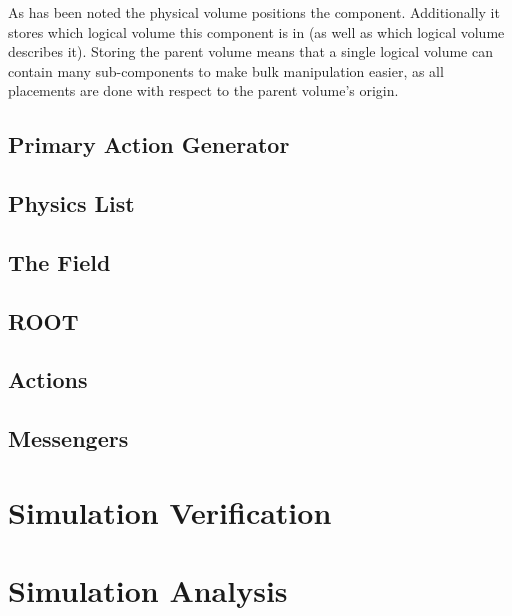 As has been noted the physical volume positions the component. Additionally it stores which logical volume this component is in (as well as which logical volume describes it). Storing the parent volume means that a single logical volume can contain many sub-components to make bulk manipulation easier, as all placements are done with respect to the parent volume's origin.  

\section{Primary Action Generator} %
\label{sec:primary_action_generator}

\section{Physics List} %
\label{sec:physics_list}

\section{The Field} %
\label{sec:the_field}

\section{ROOT} %
\label{sec:root}

\section{Actions} %
\label{sec:actions}

\section{Messengers} %
\label{sec:messengers}

\chapter{Simulation Verification} %
\label{cha:simulation_verification}

\chapter{Simulation Analysis} %
\label{cha:simulation_analysis}

